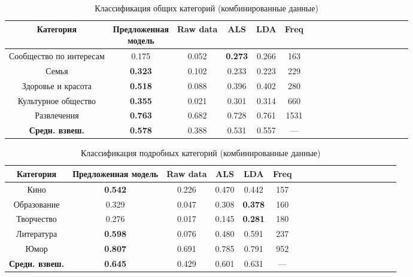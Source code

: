 \documentclass[times,specification,annotation]{itmo-student-thesis}
\begin{document}
\begin{table}[!h]
\caption{Классификация общих категорий (комбинированные данные)}\label{tab-combined-g}
\centering
\begin{tabular}{|*{18}{c|}}\hline
Категория & \thead{Предложенная \\  модель} & Raw data & ALS & LDA & Freq \\\hline
Сообщество по интересам           & 0.175 & 0.052 & \textbf{0.273} & 0.266 & 163 \\\hline
Семья           & \textbf{0.323} & 0.102 & 0.233 & 0.223 & 229 \\\hline
Здоровье и красота            & \textbf{0.518} & 0.088 & 0.396 & 0.402 & 280  \\\hline
Культурное общество           & \textbf{0.355} & 0.021 & 0.301 & 0.314 & 660 \\\hline
Развлечения            & \textbf{0.763} & 0.682 & 0.728 & 0.761 & 1531 \\\hline
\textbf{Средн. взвеш. } & \textbf{0.578} & 0.388 & 0.531 & 0.557 & --- \\\hline
\end{tabular}
\end{table}


\begin{table}[!h]
\caption{Классификация подробных категорий (комбинированные данные)}\label{tab-combined-d}
\centering
\begin{tabular}{|*{18}{c|}}\hline
Категория & Предложенная модель  & Raw data & ALS & LDA & Freq \\\hline
Кино            & \textbf{0.542} & 0.226 & 0.470 & 0.442 & 157 \\\hline
Образование           & 0.329 & 0.047 & 0.308 & \textbf{0.378} & 160 \\\hline
Творчество            & 0.276 & 0.017 & 0.145 & \textbf{0.281} & 180 \\\hline
Литература          & \textbf{0.598} & 0.076 & 0.480 & 0.591 & 237  \\\hline
Юмор           & \textbf{0.807} & 0.691 & 0.785 & 0.791 & 952 \\\hline
\textbf{Средн. взвеш.}  & \textbf{0.645} & 0.429 & 0.601 & 0.631 & --- \\\hline
\end{tabular}
\end{table}
\end{document}
